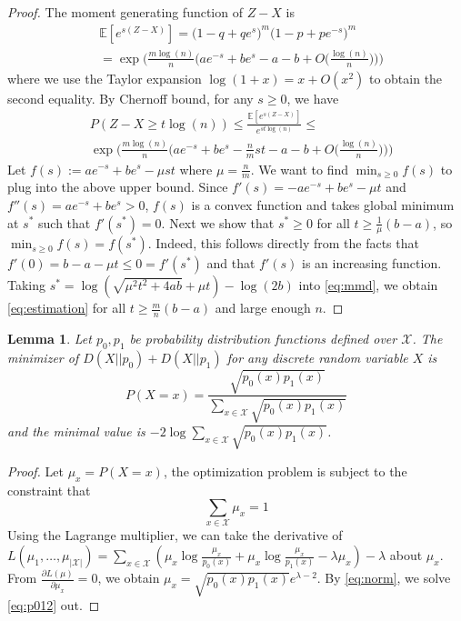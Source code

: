 \documentclass[conference]{IEEEtran}
\newtheorem{lemma}{Lemma}
\begin{document}
\begin{proof}
    The moment generating function of $Z-X$ is
    \begin{align*}
    &\mathbb{E}[e^{s(Z-X)}]  = 
    \Big(1-q+q e^s \Big)^{m}
    \Big(1-p+pe^{-s} \Big)^{m}  \\
    & = 
    \exp\Big(\frac{m\log(n)}{n} \Big( a e^{-s}+b e^s-a-b + O\big(\frac{\log(n)}{n}\big) \Big)\Big)
    \end{align*}
    where we use the Taylor expansion $\log(1+x)=x+O(x^2)$ to obtain the second equality.
    By Chernoff bound, for any $s\ge 0$, we have
    \begin{equation} \label{eq:mmd}
    \begin{aligned}
    & P(Z-X \geq t\log(n))\leq
    \frac{\mathbb{E}[e^{s(Z-X)}]}{e^{st\log(n)}} \le \\
     & \exp\Big(\frac{m\log(n)}{n} \Big( a e^{-s}+b e^s -\frac{n}{m}st -a-b + O\big(\frac{\log(n)}{n}\big) \Big)\Big)
    \end{aligned}
    \end{equation}
    Let $f(s):=a e^{-s}+be^s-\mu st$ where $\mu=\frac{n}{m}$. We want to find $\min_{s\ge 0}f(s)$ to plug into the above upper bound. Since 
    $f'(s)=-ae^{-s}+be^s-\mu t$ and 
    $f''(s)=ae^{-s}+be^s>0$, $f(s)$ is a convex function and takes global minimum at $s^\ast$ such that $f'(s^\ast)=0$. Next we show that $s^\ast\ge 0$ for all $t\ge \frac{1}{\mu}(b-a)$, so $\min_{s\ge 0}f(s)=f(s^\ast)$. Indeed, this follows directly from the facts that $f'(0)=b-a-\mu t\le 0=f'(s^\ast)$ and that $f'(s)$ is an increasing function. Taking $s^\ast=\log(\sqrt{\mu^2 t^2+4ab}+\mu t)-\log(2b)$ into \eqref{eq:mmd}, we obtain \eqref{eq:estimation} for all $t \geq \frac{m}{n}(b-a) $ and large enough $n$.
\end{proof}
\begin{lemma}\label{lem:p0p12}
	Let $p_0, p_1$ be probability distribution functions defined over $\mathcal{X}$. The minimizer
	of $D(X||p_0) + D(X||p_1)$ for any discrete random variable $X$ is
	\begin{equation}\label{eq:p012}
	P(X=x)=\frac{\sqrt{p_0(x)p_1(x)}}{ \sum_{x\in \mathcal{X}} \sqrt{p_0(x) p_1(x)}}
	\end{equation}
	and the minimal value is
	$-2\log \sum_{x\in \mathcal{X}} \sqrt{p_0(x) p_1(x)}$.
\end{lemma}
\begin{proof}
	Let $\mu_x = P(X=x)$, the optimization problem is subject to the constraint that
	\begin{equation}\label{eq:norm}
	\sum_{x \in \mathcal{X}} \mu_x = 1
	\end{equation}
	Using the Lagrange multiplier, we can take
	the derivative of $L(\mu_1, \dots, \mu_{|\mathcal{X}|})=\sum_{x \in \mathcal{X}}
	(\mu_x\log \frac{\mu_x}{p_0(x)} +\mu_x \log \frac{\mu_x}{p_1(x)}
	-\lambda\mu_x) -\lambda$ about $\mu_x$.
	From $\frac{\partial L(\mu)}{\partial \mu_x} = 0$, we obtain $\mu_x = \sqrt{p_0(x)p_1(x)}e^{\lambda-2}$.
	By \eqref{eq:norm}, we solve \eqref{eq:p012} out.	
\end{proof}
\end{document}
